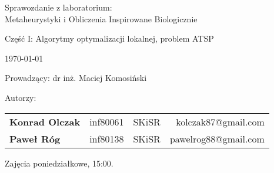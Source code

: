 \thispagestyle{empty} %

\begin{center}
{\large{Sprawozdanie z laboratorium:\\
Metaheurystyki i Obliczenia Inspirowane Biologicznie}}

\vspace{3ex}

Część I: Algorytmy optymalizacji lokalnej, problem ATSP

\vspace{3ex}
{\footnotesize\today}

\end{center}


\vspace{10ex}

Prowadzący: dr inż. Maciej Komosiński

\vspace{5ex}

Autorzy:
\begin{tabular}{lllr}
\textbf{Konrad Olczak} & inf80061 & SKiSR & kolczak87@gmail.com \\
\textbf{Paweł Róg} & inf80138 & SKiSR & pawelrog88@gmail.com \\
\end{tabular}

\vspace{5ex}

Zajęcia poniedziałkowe, 15:00.

\newpage

